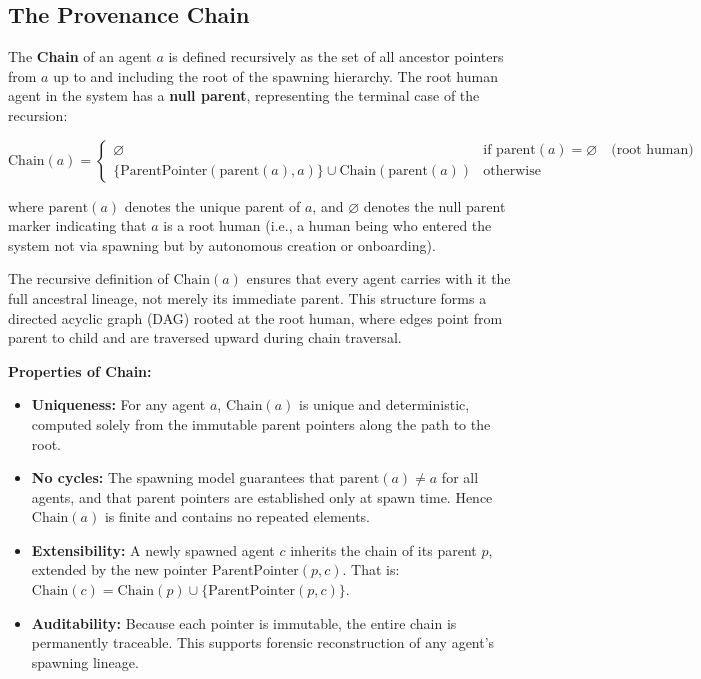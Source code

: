 \subsection{The Provenance Chain}

The \textbf{Chain} of an agent \(a\) is defined recursively as the set of all ancestor pointers from \(a\) up to and including the root of the spawning hierarchy. The root human agent in the system has a \textbf{null parent}, representing the terminal case of the recursion:

\begin{equation}
\text{Chain}(a) = 
\begin{cases}
\varnothing & \text{if } \text{parent}(a) = \varnothing \quad \text{(root human)} \\
\{\text{ParentPointer}(\text{parent}(a), a)\} \cup \text{Chain}(\text{parent}(a)) & \text{otherwise}
\end{cases}
\end{equation}

where \(\text{parent}(a)\) denotes the unique parent of \(a\), and \(\varnothing\) denotes the null parent marker indicating that \(a\) is a root human (i.e., a human being who entered the system not via spawning but by autonomous creation or onboarding).

The recursive definition of \(\text{Chain}(a)\) ensures that every agent carries with it the full ancestral lineage, not merely its immediate parent. This structure forms a directed acyclic graph (DAG) rooted at the root human, where edges point from parent to child and are traversed upward during chain traversal.

\textbf{Properties of Chain:}

\begin{itemize}
    \item \textbf{Uniqueness:} For any agent \(a\), \(\text{Chain}(a)\) is unique and deterministic, computed solely from the immutable parent pointers along the path to the root.
    \item \textbf{No cycles:} The spawning model guarantees that \(\text{parent}(a) \neq a\) for all agents, and that parent pointers are established only at spawn time. Hence \(\text{Chain}(a)\) is finite and contains no repeated elements.
    \item \textbf{Extensibility:} A newly spawned agent \(c\) inherits the chain of its parent \(p\), extended by the new pointer \(\text{ParentPointer}(p, c)\). That is: \(\text{Chain}(c) = \text{Chain}(p) \cup \{\text{ParentPointer}(p, c)\}\).
    \item \textbf{Auditability:} Because each pointer is immutable, the entire chain is permanently traceable. This supports forensic reconstruction of any agent's spawning lineage.
\end{itemize}

